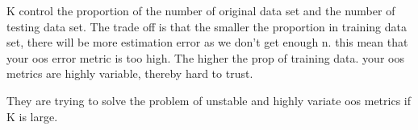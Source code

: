 \documentclass[12pt]{article}
\begin{document}
\begin{enumerate}


K control the proportion of the number of original data set and the number of testing data set. The trade off is that the smaller the proportion in training data set, there will be more estimation error as we don't get enough n. this mean that your oos error metric is too high. The higher the prop of training data. your oos metrics are highly variable, thereby hard to trust.


They are trying to solve the problem of unstable and highly variate oos metrics if K is large.



\end{enumerate}
\end{document}
